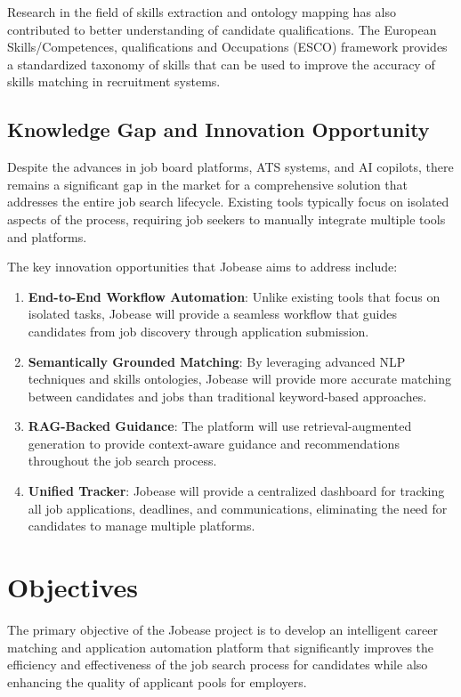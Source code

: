 \documentclass[12pt,a4paper]{report}
\begin{document}
Research in the field of skills extraction and ontology mapping has also contributed to better understanding of candidate qualifications. The European Skills/Competences, qualifications and Occupations (ESCO) framework \cite{esco2021} provides a standardized taxonomy of skills that can be used to improve the accuracy of skills matching in recruitment systems.

\section*{Knowledge Gap and Innovation Opportunity}

Despite the advances in job board platforms, ATS systems, and AI copilots, there remains a significant gap in the market for a comprehensive solution that addresses the entire job search lifecycle. Existing tools typically focus on isolated aspects of the process, requiring job seekers to manually integrate multiple tools and platforms.

The key innovation opportunities that Jobease aims to address include:

\begin{enumerate}
    \item \textbf{End-to-End Workflow Automation}: Unlike existing tools that focus on isolated tasks, Jobease will provide a seamless workflow that guides candidates from job discovery through application submission.
    \item \textbf{Semantically Grounded Matching}: By leveraging advanced NLP techniques and skills ontologies, Jobease will provide more accurate matching between candidates and jobs than traditional keyword-based approaches.
    \item \textbf{RAG-Backed Guidance}: The platform will use retrieval-augmented generation to provide context-aware guidance and recommendations throughout the job search process.
    \item \textbf{Unified Tracker}: Jobease will provide a centralized dashboard for tracking all job applications, deadlines, and communications, eliminating the need for candidates to manage multiple platforms.
\end{enumerate}

\chapter{Objectives}

The primary objective of the Jobease project is to develop an intelligent career matching and application automation platform that significantly improves the efficiency and effectiveness of the job search process for candidates while also enhancing the quality of applicant pools for employers.
\end{document}
